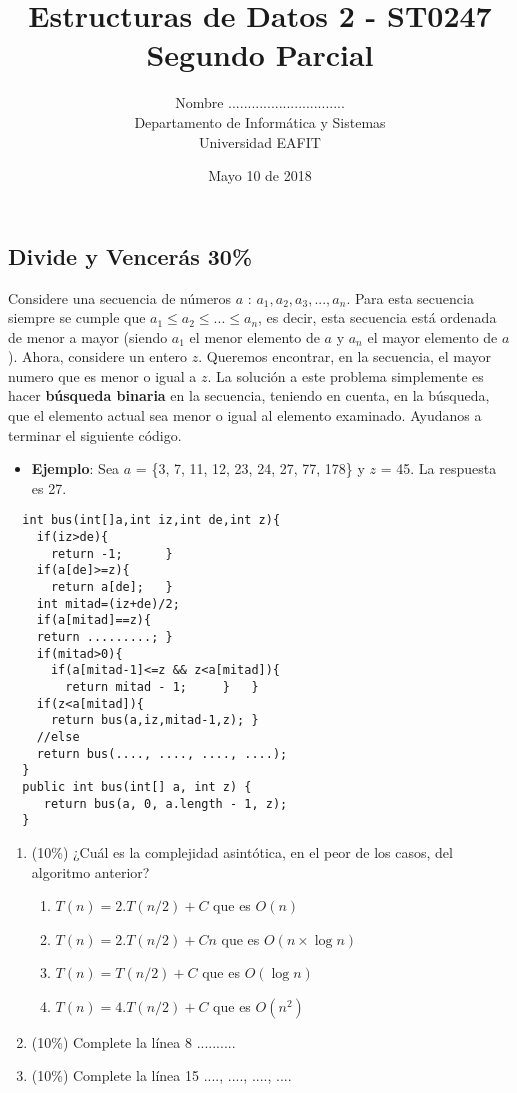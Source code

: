 \documentclass[10 pt]{article}
\title{\textbf {Estructuras de Datos 2 - ST0247\\Segundo Parcial}}
\author{Nombre ..............................\\
		Departamento de Informática y Sistemas\\
		Universidad EAFIT\\}
\date{Mayo 10 de 2018}
\begin{document}
\lstset{escapechar=@,style=customc, numbers=left, stepnumber = 1} 
\maketitle
\begin{multicols}{2}
\section{Divide y Vencerás 30\%}
Considere una secuencia de números $a$ : $a_1, a_2, a_3, ..., a_n$. Para esta secuencia siempre se cumple que $a_1 \leq a_2 \leq ... \leq a_n$, es decir, esta secuencia está ordenada de menor a mayor (siendo $a_1$ el menor elemento de $a$ y $a_n$ el mayor elemento de $a$). Ahora, considere un entero $z$. Queremos encontrar, en la secuencia, el mayor numero que es menor o igual a $z$. 
La solución a este problema simplemente es hacer \textbf{búsqueda binaria} en la secuencia, teniendo en cuenta, en la búsqueda, que el elemento actual sea menor o igual al elemento examinado. Ayudanos a terminar el siguiente código.
\begin{itemize}
\item \textbf{Ejemplo}: Sea $a$ = \{3, 7, 11, 12, 23, 24, 27, 77, 178\} y $z$ = 45. La respuesta es 27. 
\end{itemize}
\begin{lstlisting}
  int bus(int[]a,int iz,int de,int z){
    if(iz>de){
      return -1;      }  
    if(a[de]>=z){
      return a[de];   }
    int mitad=(iz+de)/2;
    if(a[mitad]==z){
    return .........; }
    if(mitad>0){
      if(a[mitad-1]<=z && z<a[mitad]){
        return mitad - 1;     }   }
    if(z<a[mitad]){
      return bus(a,iz,mitad-1,z); }
    //else
    return bus(...., ...., ...., ....);
  }
  public int bus(int[] a, int z) {
     return bus(a, 0, a.length - 1, z);
  }
\end{lstlisting}
\begin{enumerate}[label=(\alph*)]
\item (10\%) ¿Cuál es la complejidad asintótica, en el peor de los casos, del algoritmo anterior?
\begin{enumerate}[label=(\roman*)]
\item $T(n) = 2.T(n/2) + C$ que es $O(n)$
\item $T(n) = 2.T(n/2) +Cn$ que es $O(n\times\log n)$
\item $T(n) = T(n/2) + C$ que es $O(\log n)$
\item $T(n) = 4.T(n/2) + C$ que es $O(n^2)$
\end{enumerate}
\item (10\%) Complete la línea 8 ..........
\item (10\%) Complete la línea 15 ...., ...., ...., ....
\end{enumerate}


\end{multicols}
\end{document}

